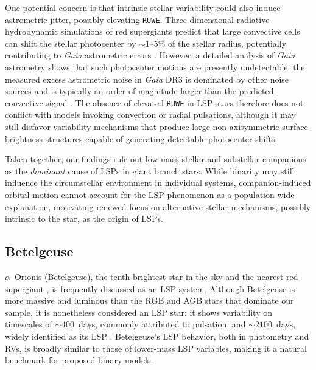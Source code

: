 \documentclass[trackchanges,twocolumn]{aastex631}
\begin{document}
One potential concern is that intrinsic stellar variability could also induce astrometric jitter, possibly elevating {\tt RUWE}. 
Three-dimensional radiative-hydrodynamic simulations of red supergiants predict that large convective cells can shift the stellar photocenter by $\sim1$--$5\%$ of the stellar radius, potentially contributing to {\it Gaia} astrometric errors \citep{Chiavassa22}. 
However, a detailed analysis of {\it Gaia} astrometry shows that such photocenter motions are presently undetectable: the measured excess astrometric noise in {\it Gaia} DR3 is dominated by other noise sources and is typically an order of magnitude larger than the predicted convective signal \citep{Kochanek23}. 
The absence of elevated {\tt RUWE} in LSP stars therefore does not conflict with models invoking convection or radial pulsations, although it may still disfavor variability mechanisms that produce large non-axisymmetric surface brightness structures capable of generating detectable photocenter shifts.

Taken together, our findings rule out low-mass stellar and substellar companions as the {\it dominant} cause of LSPs in giant branch stars. 
While binarity may still influence the circumstellar environment in individual systems, companion-induced orbital motion cannot account for the LSP phenomenon as a population-wide explanation, motivating renewed focus on alternative stellar mechanisms, possibly intrinsic to the star, as the origin of LSPs.

\subsection{Betelgeuse }\label{subsec:betelgeuse}

$\alpha$~Orionis (Betelgeuse), the tenth brightest star in the sky and the nearest red supergiant \citep{Hoffleit82}, is frequently discussed as an LSP system. 
Although Betelgeuse is more massive and luminous than the RGB and AGB stars that dominate our sample, it is nonetheless considered an LSP star: it shows variability on timescales of $\sim400$~days, commonly attributed to pulsation, and $\sim2100$~days, widely identified as its LSP \citep[e.g.,][]{Joyce20}. 
Betelgeuse's LSP behavior, both in photometry and RVs, is broadly similar to those of lower-mass LSP variables, making it a natural benchmark for proposed binary models.
\end{document}

